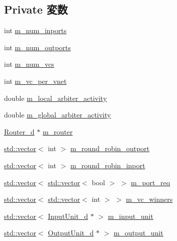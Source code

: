 \subsection*{Private 変数}
\begin{DoxyCompactItemize}
\item 
int \hyperlink{classSWallocator__d_a260af5f608c447554a07e3d62bf6b9f7}{m\_\-num\_\-inports}
\item 
int \hyperlink{classSWallocator__d_ae83c00a45968faba20d5c3bc92891fee}{m\_\-num\_\-outports}
\item 
int \hyperlink{classSWallocator__d_a2e1a9213321dfa0386cdedaf6fc22996}{m\_\-num\_\-vcs}
\item 
int \hyperlink{classSWallocator__d_a2d66b8cad5144408ed492eeff4d37c2f}{m\_\-vc\_\-per\_\-vnet}
\item 
double \hyperlink{classSWallocator__d_a5b24950c88c061e1744f0e0c80546a5a}{m\_\-local\_\-arbiter\_\-activity}
\item 
double \hyperlink{classSWallocator__d_af7d1f06c927d3409642fcf9ecfb7eae5}{m\_\-global\_\-arbiter\_\-activity}
\item 
\hyperlink{classRouter__d}{Router\_\-d} $\ast$ \hyperlink{classSWallocator__d_a81d53a65b375007289068e764da769d8}{m\_\-router}
\item 
\hyperlink{classstd_1_1vector}{std::vector}$<$ int $>$ \hyperlink{classSWallocator__d_a933149a71bec4a9e88a7da48e2a101ff}{m\_\-round\_\-robin\_\-outport}
\item 
\hyperlink{classstd_1_1vector}{std::vector}$<$ int $>$ \hyperlink{classSWallocator__d_a7861d7c128705c720f1270b25ce53f6a}{m\_\-round\_\-robin\_\-inport}
\item 
\hyperlink{classstd_1_1vector}{std::vector}$<$ \hyperlink{classstd_1_1vector}{std::vector}$<$ bool $>$ $>$ \hyperlink{classSWallocator__d_afd2909e42b8f246d3844f4fc94367932}{m\_\-port\_\-req}
\item 
\hyperlink{classstd_1_1vector}{std::vector}$<$ \hyperlink{classstd_1_1vector}{std::vector}$<$ int $>$ $>$ \hyperlink{classSWallocator__d_ac0ce291e579e519a16f76107b9796052}{m\_\-vc\_\-winners}
\item 
\hyperlink{classstd_1_1vector}{std::vector}$<$ \hyperlink{classInputUnit__d}{InputUnit\_\-d} $\ast$ $>$ \hyperlink{classSWallocator__d_a474451572c5e5813250c2f17ac3ec986}{m\_\-input\_\-unit}
\item 
\hyperlink{classstd_1_1vector}{std::vector}$<$ \hyperlink{classOutputUnit__d}{OutputUnit\_\-d} $\ast$ $>$ \hyperlink{classSWallocator__d_ab8b34c9f5479c61b8022de1aad185bae}{m\_\-output\_\-unit}
\end{DoxyCompactItemize}



